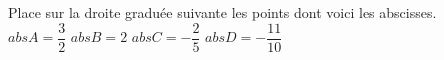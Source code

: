 %
%
Place sur la droite graduée suivante les points dont voici les abscisses. \\
    \hfil
    $abs A =\dfrac{3}{2}$
    \hfil
    $abs B =2$
    \hfil
    $abs C =-\dfrac{2}{5}$
    \hfil
    $abs D =-\dfrac{11}{10}$
    \hfil
    \begin{center}
        
    \end{center}
